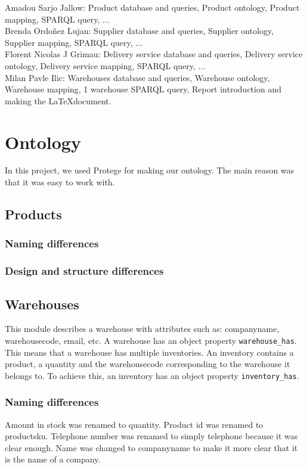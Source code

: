 \documentclass{article}
\begin{document}
\noindent Amadou Sarjo Jallow: Product database and queries, Product ontology, Product mapping, SPARQL query, ...
\\

\noindent Brenda Ordoñez Lujan: Supplier database and queries, Supplier ontology, Supplier mapping, SPARQL query, ...
\\

\noindent Florent Nicolas J Grimau: Delivery service database and queries, Delivery service ontology, Delivery service mapping, SPARQL query, ...
\\

\noindent Milan Pavle Ilic: Warehouses database and queries, Warehouse ontology, Warehouse mapping, 1 warehouse SPARQL query, Report introduction and making the \LaTeX document.



\section{Ontology}
In this project, we used Protege for making our ontology. The main reason was that it was easy to work with.


\subsection{Products}
\subsubsection{Naming differences}
\subsubsection{Design and structure differences}



\subsection{Warehouses}
This module describes a warehouse with attributes such as: companyname, warehousecode, email, etc. A warehouse has an object property \texttt{warehouse\_has}. This means that a warehouse has multiple inventories. An inventory contains a product, a quantity and the warehousecode corresponding to the warehouse it belongs to. To achieve this, an inventory has an object property \texttt{inventory\_has}.


\subsubsection{Naming differences}
Amount in stock was renamed to quantity. Product id was renamed to productsku. Telephone number was renamed to simply telephone because it was clear enough. Name was changed to companyname to make it more clear that it is the name of a company.
\end{document}
